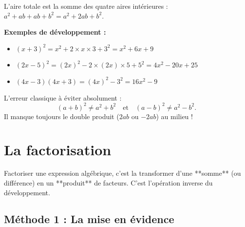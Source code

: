 \documentclass[11pt,a4paper]{article}
\begin{document}
\begin{center}
\end{center}

L'aire totale est la somme des quatre aires intérieures : $a^2 + ab + ab + b^2 = a^2 + 2ab + b^2$.

\textbf{Exemples de développement :}
\begin{itemize}
  \item $(x + 3)^2 = x^2 + 2 \times x \times 3 + 3^2 = x^2 + 6x + 9$
  \item $(2x - 5)^2 = (2x)^2 - 2 \times (2x) \times 5 + 5^2 = 4x^2 - 20x + 25$
  \item $(4x - 3)(4x + 3) = (4x)^2 - 3^2 = 16x^2 - 9$
\end{itemize}

\begin{attention}
L'erreur classique à éviter absolument : 
\[
(a + b)^2 \neq a^2 + b^2 \quad \text{et} \quad (a - b)^2 \neq a^2 - b^2.
\]
Il manque toujours le double produit ($2ab$ ou $-2ab$) au milieu !
\end{attention}

\section{La factorisation}

Factoriser une expression algébrique, c'est la transformer d'une **somme** (ou différence) en un **produit** de facteurs. C'est l'opération inverse du développement.

\subsection{Méthode 1 : La mise en évidence}
\end{document}
